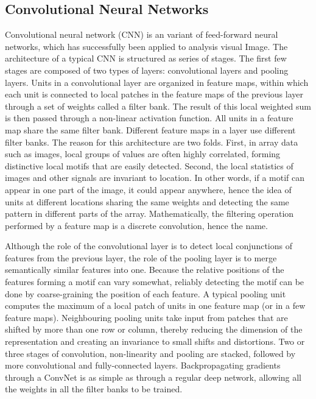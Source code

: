 \documentclass[10pt,conference,letterpaper]{IEEEtran}
\begin{document}
\subsection{Convolutional Neural Networks}
Convolutional neural network (CNN) is an variant of feed-forward neural networks, which has successfully been applied to analysis visual Image. The architecture of a typical CNN is structured as series of stages. The first few stages are composed of two types of layers: convolutional layers and pooling layers. Units in a convolutional layer are organized in feature maps, within which each unit is connected to local patches in the feature maps of the previous layer through a set of weights called a filter bank. The result of this local weighted sum is then passed through a non-linear activation function. All units in a feature map share the same filter bank. Different feature maps in a layer use different filter banks. The reason for this architecture are two folds. First, in array data such as images, local groups of values are often highly correlated, forming distinctive local motifs that are easily detected. Second, the local statistics of images and other signals are invariant to location. In other words, if a motif can appear in one part of the image, it could appear anywhere, hence the idea of units at different locations sharing the same weights and
detecting the same pattern in different parts of the array. Mathematically, the filtering operation performed by a feature map is a discrete convolution, hence the name.

Although the role of the convolutional layer is to detect local conjunctions of features from the previous layer, the role of the pooling layer is to merge semantically similar features into one. Because the relative positions of the features forming a motif can vary somewhat, reliably detecting the motif can be done by coarse-graining the position of each feature. A typical pooling unit computes the maximum of a local patch of units in one feature map (or in a few feature maps). Neighbouring pooling units take input from patches that are shifted by more than one row or column, thereby reducing the dimension of the representation and creating an invariance to small shifts and distortions. Two or three stages of convolution, non-linearity and pooling are stacked, followed by more convolutional and fully-connected layers. Backpropagating gradients through a ConvNet is as simple as through a regular deep network, allowing all the weights in all the filter banks to be trained. 
\end{document}
